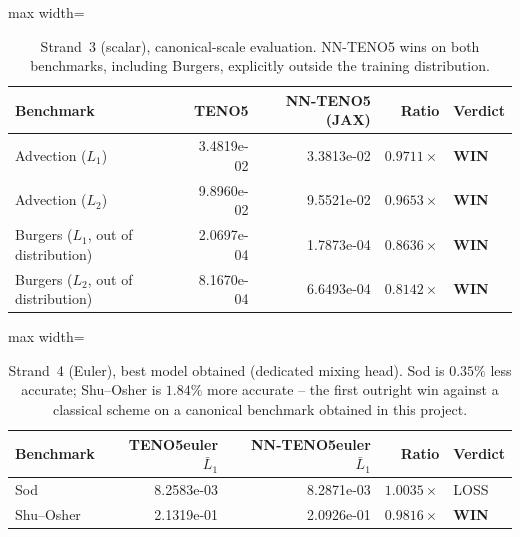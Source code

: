 \documentclass[12pt,a4paper,oneside]{report}
\begin{document}
\begin{table}[H]
\centering
\begin{adjustbox}{max width=\textwidth}
\begin{tabular}{lrrrl}
\toprule
\textbf{Benchmark} & \textbf{TENO5} & \textbf{NN-TENO5 (JAX)} & \textbf{Ratio} & \textbf{Verdict} \\
\midrule
Advection ($L_1$) & 3.4819e-02 & 3.3813e-02 & $0.9711\times$ & \textbf{WIN} \\
\rowrule
Advection ($L_2$) & 9.8960e-02 & 9.5521e-02 & $0.9653\times$ & \textbf{WIN} \\
\rowrule
Burgers ($L_1$, out of distribution) & 2.0697e-04 & 1.7873e-04 & $0.8636\times$ & \textbf{WIN} \\
\rowrule
Burgers ($L_2$, out of distribution) & 8.1670e-04 & 6.6493e-04 & $0.8142\times$ & \textbf{WIN} \\
\bottomrule
\end{tabular}
\end{adjustbox}
\caption{Strand~3 (scalar), canonical-scale evaluation. NN-TENO5 wins on both
benchmarks, including Burgers, explicitly outside the training distribution.}
\label{tab:strand3}
\end{table}

\begin{table}[H]
\centering
\begin{adjustbox}{max width=\textwidth}
\begin{tabular}{lrrrl}
\toprule
\textbf{Benchmark} & \textbf{TENO5euler $\bar L_1$} & \textbf{NN-TENO5euler $\bar L_1$} & \textbf{Ratio} & \textbf{Verdict} \\
\midrule
Sod & 8.2583e-03 & 8.2871e-03 & $1.0035\times$ & LOSS \\
\rowrule
Shu--Osher & 2.1319e-01 & 2.0926e-01 & $0.9816\times$ & \textbf{WIN} \\
\bottomrule
\end{tabular}
\end{adjustbox}
\caption{Strand~4 (Euler), best model obtained (dedicated mixing head). Sod is
$0.35\%$ less accurate; Shu--Osher is $1.84\%$ more accurate -- the first
outright win against a classical scheme on a canonical benchmark obtained in
this project.}
\label{tab:strand4}
\end{table}
\end{document}
